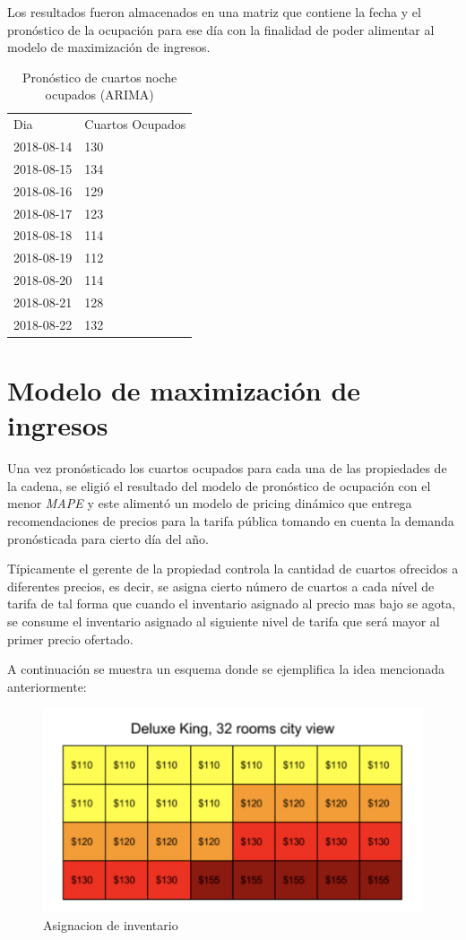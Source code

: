 Los resultados fueron almacenados en una matriz que contiene la fecha y el pronóstico de la ocupación para ese día con la finalidad de poder alimentar al modelo de maximización de ingresos.

\begin{table}[H]
\centering
\begin{tabular}{ll}
Dia        & Cuartos Ocupados \\
2018-08-14 & 130              \\
2018-08-15 & 134              \\
2018-08-16 & 129              \\
2018-08-17 & 123              \\
2018-08-18 & 114              \\
2018-08-19 & 112              \\
2018-08-20 & 114              \\
2018-08-21 & 128              \\
2018-08-22 & 132              
\end{tabular}
\caption{Pronóstico de cuartos noche ocupados (ARIMA)} 
\end{table}


\section*{Modelo de maximización de ingresos}

Una vez pronósticado los cuartos ocupados para cada una de las propiedades de la cadena, se eligió el resultado del modelo de pronóstico de ocupación con el menor \emph{MAPE} y este alimentó un modelo de pricing dinámico que entrega recomendaciones de precios para la tarifa pública tomando en cuenta la demanda pronósticada para cierto día del año.

Típicamente el gerente de la propiedad controla la cantidad de cuartos ofrecidos a diferentes precios, es decir, se asigna cierto número de cuartos a cada nível de tarifa de tal forma que cuando el inventario asignado al precio mas bajo se agota, se consume el inventario asignado al siguiente nivel de tarifa que será mayor al primer precio ofertado.

A continuación se muestra un esquema donde se ejemplifica la idea mencionada anteriormente:

\begin{figure}[H]
  \includegraphics[width=\linewidth]{Figures/buckets.png}
  \caption{Asignacion de inventario}
  \label{fig:Asignacion de Inventario}
\end{figure}

